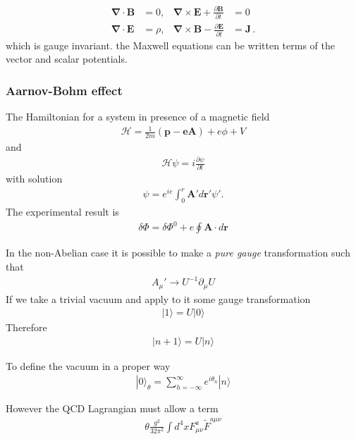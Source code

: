 \documentclass[12pt,letterpaper]{article}
\begin{document}
\begin{align}
  \label{eq:hom_m_eq}
  \boldsymbol{\nabla}\cdot\mathbf{B}&=0,&\boldsymbol{\nabla}\times \mathbf{E}+\frac{\partial\mathbf{B}}{\partial t}&=0\\
  \label{eq:inhom_m_eq}
  \boldsymbol{\nabla}\cdot\mathbf{E}&=\rho,&\boldsymbol{\nabla}\times \mathbf{B}-\frac{\partial\mathbf{E}}{\partial t}&=\mathbf{J}\,.
\end{align}
which is gauge invariant. the Maxwell equations can be written  terms of the vector and scalar potentials.

\subsubsection{Aarnov-Bohm  effect}
The Hamiltonian for a system in presence of a magnetic field
\begin{align*}
  \mathcal{H}=\frac{1}{2m}\left( \mathbf{p-e\mathbf{A}} \right)+
e\phi+V
\end{align*}
and
\begin{align*}
  \mathcal{H}\psi=i \frac{\partial \psi}{\partial t}
\end{align*}
with solution
\begin{align*}
  \psi=e^{i e} \int_0^r\mathbf{A}'d\mathbf{r}' \psi'. 
\end{align*}
The experimental result is
\begin{align*}
  \delta\Phi=\delta\Phi^0+e\oint \mathbf{A}\cdot d\mathbf{r}
\end{align*}

In the non-Abelian case it is possible to make a \emph{pure gauge} transformation such that
\begin{align*}
  A_{\mu}'\to U^{-1}\partial _{\mu}U
\end{align*}
If we take a trivial vacuum and apply to it some gauge transformation
\begin{align*}
  |1\rangle=U|0\rangle
\end{align*}
Therefore
\begin{align*}
    |n+1\rangle=U|n\rangle
\end{align*}

To define the vacuum in a proper way
\begin{align*}
|0\rangle_\theta=  \sum_{h=-\infty}^{\infty}e^{i\theta_n}|n\rangle
\end{align*}

However the QCD Lagrangian must allow a term
\begin{align*}
  \theta \frac{g^2}{32\pi^2}\int d^4 x F_{\mu\nu}^a\tilde{F}^{a\mu\nu}
\end{align*}
\end{document}
